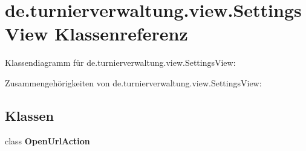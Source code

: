 \hypertarget{classde_1_1turnierverwaltung_1_1view_1_1_settings_view}{}\section{de.\+turnierverwaltung.\+view.\+Settings\+View Klassenreferenz}
\label{classde_1_1turnierverwaltung_1_1view_1_1_settings_view}


Klassendiagramm für de.\+turnierverwaltung.\+view.\+Settings\+View\+:


Zusammengehörigkeiten von de.\+turnierverwaltung.\+view.\+Settings\+View\+:
\subsection*{Klassen}
\begin{DoxyCompactItemize}
\item 
class {\bfseries Open\+Url\+Action}
\end{DoxyCompactItemize}
